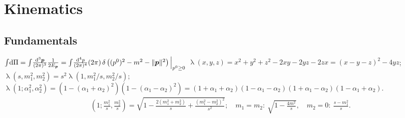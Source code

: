 \documentclass[new]{subfiles}
\begin{document}
\newcommand{\ddP}[1]{\!\frac{\dd^3\vc#1}{(2\pi)^3}}

\section{Kinematics}
\subsection{Fundamentals}
$
\int\!\dd\Pi
= \int\ddP{p}\frac{1}{2E_{\vc p}}
= \int\!\frac{\dd^4 p}{(2\pi)^4}(2\pi)\ddelta\left((p^0)^2-m^2-\|\vc p\|^2\right)\Big|_{p^0\ge0}
$
$
\mathop{\lambda}(x,y,z)
= x^2+y^2+z^2-2xy-2yz-2zx = (x-y-z)^2-4yz
$;\quad $\mathop{\lambda}(s,m_1^2,m_2^2)=s^2\mathop{\lambda}(1,m_1^2/s,m_2^2/s)$;\\
$
\mathop{\lambda}(1;\alpha_1^2,\alpha_2^2)
= (1-(\alpha_1+\alpha_2)^2)(1-(\alpha_1-\alpha_2)^2)
= (1+\alpha_1+\alpha_2)(1-\alpha_1-\alpha_2)(1+\alpha_1-\alpha_2)(1-\alpha_1+\alpha_2).
$
\begin{align}
\mathop{\lambda^{1/2}}\left(1;\frac{m_1^2}{s},\frac{m_2^2}{s}\right)
= \sqrt{1-\frac{2 (m_1^2+m_2^2)}{s}+\frac{(m_1^2-m_2^2)^2}{s^2}};\quad
m_1=m_2:\ \sqrt{1-\frac{4m^2}{s}},\quad
m_2=0:\ \frac{s-m_1^2}{s}.
\end{align}
\end{document}
